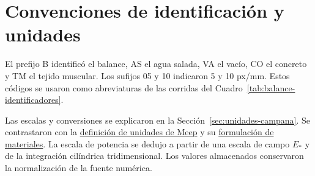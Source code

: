\section{Convenciones de identificación y unidades}
El prefijo B identificó el balance, AS el agua salada, VA el vacío, CO el concreto y TM el tejido muscular. Los sufijos 05 y 10 indicaron 5 y 10 px/mm. Estos códigos se usaron como abreviaturas de las corridas del Cuadro~\ref{tab:balance-identificadores}.

Las escalas y conversiones se explicaron en la Sección~\ref{sec:unidades-campana}. Se contrastaron con la \href{https://meep.readthedocs.io/en/latest/Introduction/#units-in-meep}{definición de unidades de Meep} y su \href{https://meep.readthedocs.io/en/latest/Materials/}{formulación de materiales}. La escala de potencia se dedujo a partir de una escala de campo $E_*$ y de la integración cilíndrica tridimensional. Los valores almacenados conservaron la normalización de la fuente numérica.
